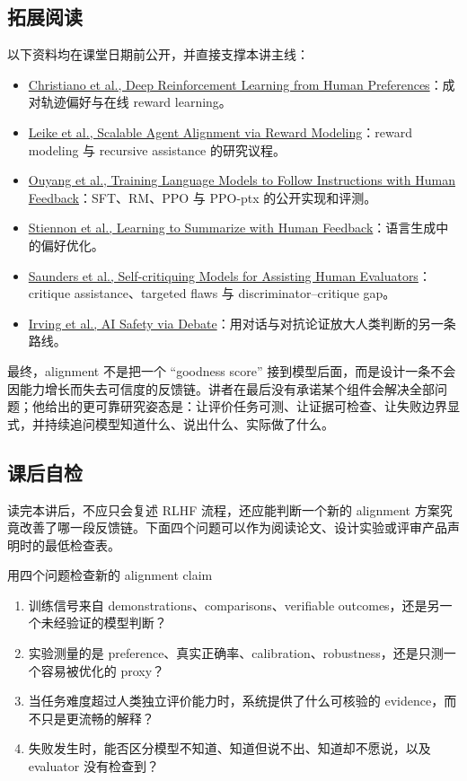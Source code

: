 \subsection{拓展阅读}

以下资料均在课堂日期前公开，并直接支撑本讲主线：

\begin{itemize}
  \item \href{https://arxiv.org/abs/1706.03741}{Christiano et al., Deep Reinforcement Learning from Human Preferences}：成对轨迹偏好与在线 reward learning。
  \item \href{https://arxiv.org/abs/1811.07871}{Leike et al., Scalable Agent Alignment via Reward Modeling}：reward modeling 与 recursive assistance 的研究议程。
  \item \href{https://arxiv.org/abs/2203.02155}{Ouyang et al., Training Language Models to Follow Instructions with Human Feedback}：SFT、RM、PPO 与 PPO-ptx 的公开实现和评测。
  \item \href{https://arxiv.org/abs/2009.01325}{Stiennon et al., Learning to Summarize with Human Feedback}：语言生成中的偏好优化。
  \item \href{https://arxiv.org/abs/2206.05802}{Saunders et al., Self-critiquing Models for Assisting Human Evaluators}：critique assistance、targeted flaws 与 discriminator--critique gap。
  \item \href{https://arxiv.org/abs/1805.00899}{Irving et al., AI Safety via Debate}：用对话与对抗论证放大人类判断的另一条路线。
\end{itemize}

最终，alignment 不是把一个 ``goodness score'' 接到模型后面，而是设计一条不会因能力增长而失去可信度的反馈链。讲者在最后没有承诺某个组件会解决全部问题；他给出的更可靠研究姿态是：让评价任务可测、让证据可检查、让失败边界显式，并持续追问模型知道什么、说出什么、实际做了什么。

\subsection{课后自检}

读完本讲后，不应只会复述 RLHF 流程，还应能判断一个新的 alignment 方案究竟改善了哪一段反馈链。下面四个问题可以作为阅读论文、设计实验或评审产品声明时的最低检查表。

\begin{knowledgebox}{用四个问题检查新的 alignment claim}
\begin{enumerate}
  \item 训练信号来自 demonstrations、comparisons、verifiable outcomes，还是另一个未经验证的模型判断？
  \item 实验测量的是 preference、真实正确率、calibration、robustness，还是只测一个容易被优化的 proxy？
  \item 当任务难度超过人类独立评价能力时，系统提供了什么可核验的 evidence，而不只是更流畅的解释？
  \item 失败发生时，能否区分模型不知道、知道但说不出、知道却不愿说，以及 evaluator 没有检查到？
\end{enumerate}
\end{knowledgebox}


